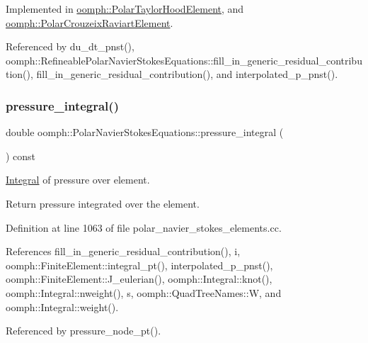 Implemented in \hyperlink{classoomph_1_1PolarTaylorHoodElement_a0ddfef8a7a5ab18b920a498be2d92cba}{oomph\+::\+Polar\+Taylor\+Hood\+Element}, and \hyperlink{classoomph_1_1PolarCrouzeixRaviartElement_ac11e6ee68acf235bb6d2b41a2bd77d89}{oomph\+::\+Polar\+Crouzeix\+Raviart\+Element}.



Referenced by du\+\_\+dt\+\_\+pnst(), oomph\+::\+Refineable\+Polar\+Navier\+Stokes\+Equations\+::fill\+\_\+in\+\_\+generic\+\_\+residual\+\_\+contribution(), fill\+\_\+in\+\_\+generic\+\_\+residual\+\_\+contribution(), and interpolated\+\_\+p\+\_\+pnst().

\mbox{\label{classoomph_1_1PolarNavierStokesEquations_ad95e0de64c45d54690bcc422cd17a1fc}} 
\subsubsection{\texorpdfstring{pressure\+\_\+integral()}{pressure\_integral()}}
{\footnotesize\ttfamily double oomph\+::\+Polar\+Navier\+Stokes\+Equations\+::pressure\+\_\+integral (\begin{DoxyParamCaption}{ }\end{DoxyParamCaption}) const}



\hyperlink{classoomph_1_1Integral}{Integral} of pressure over element. 

Return pressure integrated over the element. 

Definition at line 1063 of file polar\+\_\+navier\+\_\+stokes\+\_\+elements.\+cc.



References fill\+\_\+in\+\_\+generic\+\_\+residual\+\_\+contribution(), i, oomph\+::\+Finite\+Element\+::integral\+\_\+pt(), interpolated\+\_\+p\+\_\+pnst(), oomph\+::\+Finite\+Element\+::\+J\+\_\+eulerian(), oomph\+::\+Integral\+::knot(), oomph\+::\+Integral\+::nweight(), s, oomph\+::\+Quad\+Tree\+Names\+::W, and oomph\+::\+Integral\+::weight().



Referenced by pressure\+\_\+node\+\_\+pt().

\mbox{\label{classoomph_1_1PolarNavierStokesEquations_ae87e3863f67fb6cceb6b0e74a360febe}} 
